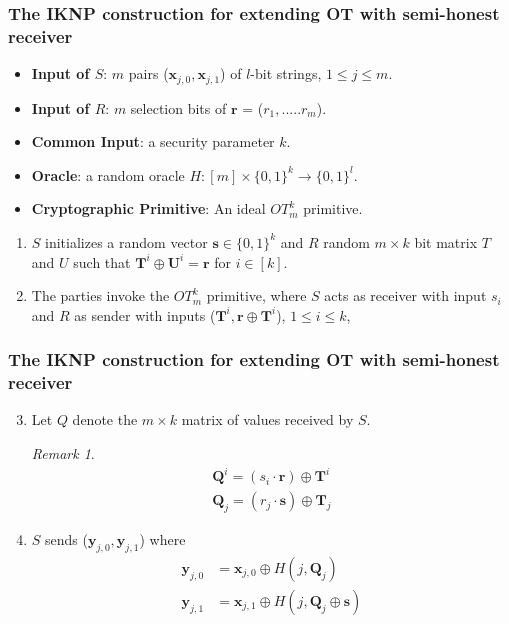 \documentclass[hyperref={pdfpagelabels=false}]{beamer}
\theoremstyle{remark}
\newtheorem*{remark}{Remark}
\begin{document}
\begin{frame}
\frametitle{The IKNP construction for extending OT with semi-honest receiver}
\begin{itemize}
\item \textbf{Input of $S$}: $m$ pairs ($\mathbf{x}_{j,0}, \mathbf{x}_{j,1}$) of $l$-bit strings, $1 \leq j \leq m$. \pause
\item \textbf{Input of $R$}: $m$ selection bits of $\mathbf{r}$ = ($r_1,.....r_m$). \pause
\item \textbf{Common Input}: a security parameter $k$.\pause
\item \textbf{Oracle}: a random oracle $H : \left[m\right] \times \{0,1\}^k \rightarrow \{0,1\}^l$. \pause
\item \textbf{Cryptographic Primitive}: An ideal $OT_m^k$ primitive.\pause
\end{itemize}
\begin{enumerate}
\item $S$ initializes a random vector $\mathbf{s} \in \{0,1\}^k$ and $R$ random $m \times k$ bit matrix $T$ and $U$ such that $\mathbf{T}^i \oplus \mathbf{U}^i = \mathbf{r}$ for $i \in [k]$. \pause
\item The parties invoke the $OT_m^k$ primitive, where $S$ acts as receiver with input $s_i$ and $R$ as sender with inputs ($\mathbf{T}^i, \mathbf{r} \oplus \mathbf{T}^i$), $1 \leq i \leq k$,
\end{enumerate}
\end{frame}

\begin{frame}
\frametitle{The IKNP construction for extending OT with semi-honest receiver}
\begin{enumerate}
\setcounter{enumi}{2}
\item Let $Q$ denote the $m \times k$ matrix of values received by $S$. \pause

\begin{remark}
\begin{align}
\mathbf{Q}^i = (s_i \cdot \mathbf{r}) \oplus \mathbf{T}^i \\
\mathbf{Q}_j = (r_j \cdot \mathbf{s}) \oplus \mathbf{T}_j
\end{align}
\end{remark}\pause
\item $S$ sends ($\mathbf{y}_{j,0}, \mathbf{y}_{j,1}$) where \pause
\begin{align*}
\mathbf{y}_{j,0} &= \mathbf{x}_{j,0} \oplus H(j,\mathbf{Q}_j) \\
\mathbf{y}_{j,1} &= \mathbf{x}_{j,1} \oplus H(j,\mathbf{Q}_j \oplus \mathbf{s})
\end{align*}

\end{enumerate}
\end{frame}
\end{document}
